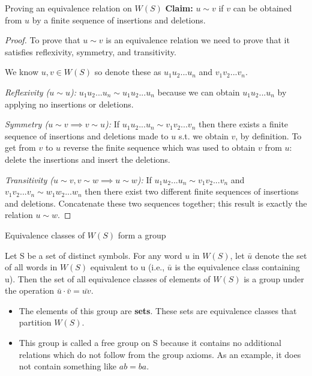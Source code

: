 \documentclass{beamer}
\begin{document}
\begin{frame}{Proving an equivalence relation on $W(S)$}
\textbf{Claim:} $u \sim v$ if $v$ can be obtained from $u$ by a finite sequence of insertions and deletions.
\begin{proof}
    To prove that $u \sim v$ is an equivalence relation we need to prove that it satisfies reflexivity, symmetry, and transitivity. \pause

    We know $u, v \in W(S)$ so denote these as $u_{1}u_{2}...u_{n}$ and $v_{1}v_{2}...v_{n}$. \pause

    \textit{Reflexivity ($u \sim u$):} $u_{1}u_{2}...u_{n} \sim u_{1}u_{2}...u_{n}$ because we can obtain $u_{1}u_{2}...u_{n}$ by applying no insertions or deletions. \pause

    \textit{Symmetry ($u \sim v \implies v \sim u$):} If $u_{1}u_{2}...u_{n} \sim v_{1}v_{2}...v_{n}$ then there exists a finite sequence of insertions and deletions made to $u$ s.t. we obtain $v$, by definition. To get from $v$ to $u$ reverse the finite sequence which was used to obtain $v$ from $u$: delete the insertions and insert the deletions. \pause

    \textit{Transitivity ($u \sim v, v \sim w \implies u \sim w$):} If $u_{1}u_{2}...u_{n} \sim v_{1}v_{2}...v_{n}$ and $v_{1}v_{2}...v_{n} \sim w_{1}w_{2}...w_{n}$ then there exist two different finite sequences of insertions and deletions. Concatenate these two sequences together; this result is exactly the relation $u \sim w$.
\end{proof}
\end{frame}

\begin{frame}{Equivalence classes of $W(S)$ form a group}
\begin{theorem}
    Let S be a set of distinct symbols. For any word $u$ in $W(S)$, let $\bar{u}$ denote the set of all words in $W(S)$ equivalent to u (i.e., $\bar{u}$ is the equivalence class containing u). Then the set of all equivalence classes of elements of $W(S)$ is a group under the operation $\bar{u} \cdot \bar{v} = \bar{uv}$.
\end{theorem}

\begin{itemize}
    \item<1-> The elements of this group are \textbf{sets}. These sets are equivalence classes that partition $W(S)$.
    \item<2-> This group is called a free group on S because it contains no additional relations which do not follow from the group axioms. As an example, it does not contain something like $ab = ba$.
\end{itemize}

\end{frame}
\end{document}
